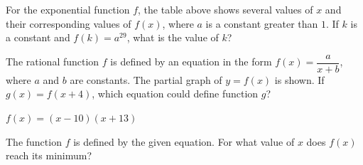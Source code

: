 For the exponential function $f$, the table above shows several values of $x$ and their corresponding values of $f(x)$,  
where $a$ is a constant greater than $1$. If $k$ is a constant and $f(k) = a^{29}$, what is the value of $k$?


\vspace{2em}

\noindent\markforreview

\begin{center}
    


\end{center}

The rational function $f$ is defined by an equation in the form $f(x) = \dfrac{a}{x + b}$, where $a$ and $b$ are constants.  
The partial graph of $y = f(x)$ is shown.  
If $g(x) = f(x + 4)$, which equation could define function $g$?

\vspace{0.40em}


\vspace{2em}

\noindent\markforreview
\vspace{1em}

$f(x) = (x - 10)(x + 13)$

The function $f$ is defined by the given equation.  
For what value of $x$ does $f(x)$ reach its minimum?

\vspace{0.75em}


\vspace{2em}

\noindent\markforreview
\vspace{1em}

